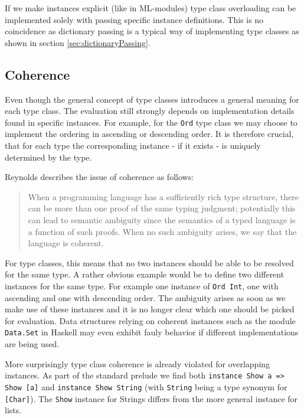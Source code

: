 If we make instances explicit (like in ML-modules) type class overloading can be implemented solely with passing specific instance definitions.
This is no coincidence as dictionary passing is a typical way of implementing type classes as shown in section \ref{sec:dictionaryPassing}.

\subsection{Coherence}\label{sec:coherence}

Even though the general concept of type classes introduces a general meaning for each type class.
The evaluation still strongly depends on implementation details found in specific instances.
For example, for the \texttt{Ord} type class we may choose to implement the ordering in ascending or descending order.
It is therefore crucial, that for each type the corresponding instance - if it exists - is uniquely determined by the type.

Reynolds \cite{reynolds_coherence} describes the issue of coherence as follows:

\begin{quote}
    When a programming language has a sufficiently rich type structure, there can be more than one proof of the same
    typing judgment; potentially this can lead to semantic ambiguity since the semantics of a typed language is a function
    of such proofs. When no such ambiguity arises, we say that the language is coherent.
\end{quote}

For type classes, this means that no two instances should be able to be resolved for the same type.
A rather obvious example would be to define two different instances for the same type.
For example one instance of \texttt{Ord Int}, one with ascending and one with descending order.
The ambiguity arises as soon as we make use of these instances and it is no longer clear which one should be picked for evaluation.
Data structures relying on coherent instances such as the module \texttt{Data.Set} in Haskell may even exhibit fauly behavior if different implementations are being used. \cite{Kilpatrick2019-cy}

More surprisingly type class coherence is already violated for overlapping instances.
As part of the standard prelude we find both \texttt{instance Show a => Show [a]} and \texttt{instance Show String}
(with \texttt{String} being a type synonym for \texttt{[Char]}).
The \texttt{Show} instance for Strings differs from the more general instance for lists.

